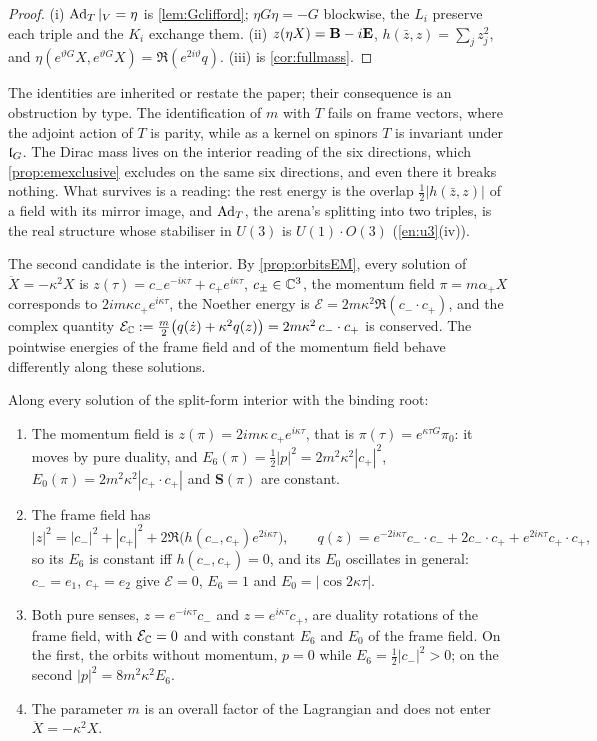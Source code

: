 \begin{proof}
(i) $\operatorname{Ad}_T|_V=\eta$ is \cref{lem:Gclifford}; $\eta G\eta=-G$ blockwise, the $L_i$ preserve each triple and the $K_i$ exchange them. (ii)
$z(\eta X)=\mathbf B-i\mathbf E$, $h(\bar z,z)=\sum_jz_j^2$, and $\eta(e^{\vartheta G}X,e^{\vartheta G}X)=\Re(e^{2i\vartheta}q)$. (iii) is \cref{cor:fullmass}.
\end{proof}

The identities are inherited or restate the paper; their consequence is an obstruction by type. The identification of $m$ with $T$ fails on frame
vectors, where the adjoint action of $T$ is parity, while as a kernel on spinors $T$ is invariant under $\mathfrak l_G$. The Dirac mass lives on the interior
reading of the six directions, which \cref{prop:emexclusive} excludes on the same six directions, and even there it breaks nothing. What survives
is a reading: the rest energy is the overlap $\tfrac12|h(\bar z,z)|$ of a field with its mirror image, and $\operatorname{Ad}_T$, the arena's splitting into
two triples, is the real structure whose stabiliser in $U(3)$ is $U(1)\cdot O(3)$ (\cref{en:u3}(iv)).

The second candidate is the interior. By \cref{prop:orbitsEM}, every solution of $\ddot X=-\kappa^2X$ is $z(\tau)=c_-e^{-i\kappa\tau}+c_+e^{i\kappa\tau}$,
$c_\pm\in\mathbb{C}^3$, the momentum field $\pi=m\alpha_+X$ corresponds to $2im\kappa c_+e^{i\kappa\tau}$, the Noether energy is $\mathcal E=2m\kappa^2\Re(c_-\cdot c_+)$, and the
complex quantity $\mathcal E_{\mathbb{C}}:=\tfrac m2\bigl(q(\dot z)+\kappa^2q(z)\bigr)=2m\kappa^2\,c_-\cdot c_+$ is conserved. The pointwise energies of the frame
field and of the momentum field behave differently along these solutions.

\begin{proposition}
\label{en:interior}
Along every solution of the split-form interior with the binding root:
\begin{enumerate}[label=(\roman*),leftmargin=2.2em]
\item The momentum field is $z(\pi)=2im\kappa\,c_+e^{i\kappa\tau}$, that is $\pi(\tau)=e^{\kappa\tau G}\pi_0$: it moves by pure duality, and
$E_6(\pi)=\tfrac12|p|^2=2m^2\kappa^2|c_+|^2$, $E_0(\pi)=2m^2\kappa^2|c_+\cdot c_+|$ and $\mathbf S(\pi)$ are constant.
\item The frame field has
\[
|z|^2=|c_-|^2+|c_+|^2+2\Re\bigl(h(c_-,c_+)e^{2i\kappa\tau}\bigr),\qquad q(z)=e^{-2i\kappa\tau}c_-\cdot c_-+2c_-\cdot c_++e^{2i\kappa\tau}c_+\cdot c_+ ,
\]
so its $E_6$ is constant iff $h(c_-,c_+)=0$, and its $E_0$ oscillates in general: $c_-=e_1$, $c_+=e_2$ give $\mathcal E=0$, $E_6=1$ and
$E_0=|\cos2\kappa\tau|$.
\item Both pure senses, $z=e^{-i\kappa\tau}c_-$ and $z=e^{i\kappa\tau}c_+$, are duality rotations of the frame field, with $\mathcal E_{\mathbb{C}}=0$ and with
constant $E_6$ and $E_0$ of the frame field. On the first, the orbits without momentum, $p=0$ while $E_6=\tfrac12|c_-|^2>0$; on the second
$|p|^2=8m^2\kappa^2E_6$.
\item The parameter $m$ is an overall factor of the Lagrangian and does not enter $\ddot X=-\kappa^2X$.
\end{enumerate}
\end{proposition}

